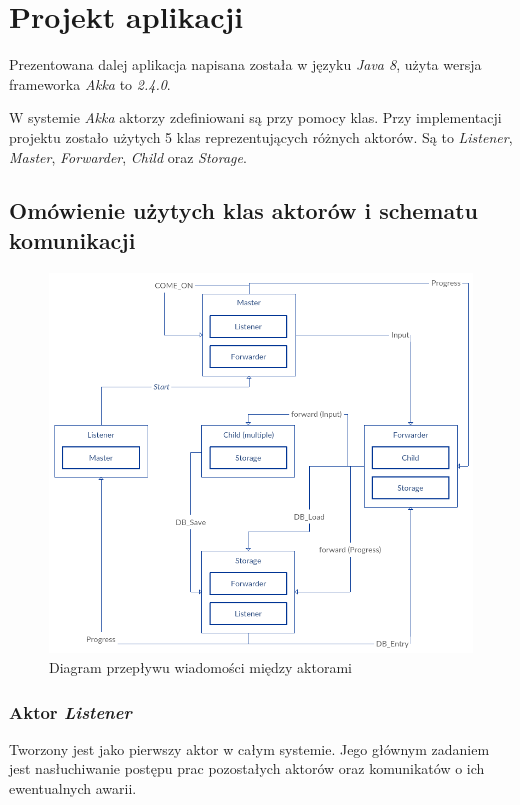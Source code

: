 \documentclass[12pt,titlepage]{article}
\numberwithin{equation}{section}
\begin{document}
\section{Projekt aplikacji}
Prezentowana dalej aplikacja napisana została w języku \textit{Java 8}, użyta wersja frameworka \textit{Akka} to \textit{2.4.0}.

W systemie \textit{Akka} aktorzy zdefiniowani są przy pomocy klas. Przy implementacji projektu zostało użytych 5 klas reprezentujących różnych aktorów. Są to \textit{Listener}, \textit{Master}, \textit{Forwarder}, \textit{Child} oraz \textit{Storage}.

\subsection{Omówienie użytych klas aktorów i schematu komunikacji}

\begin{figure}[H]
\begin{center}
\includegraphics[scale=0.5]{akka.png}
\end{center}
\caption{Diagram przepływu wiadomości między aktorami} %
\end{figure} 

\subsubsection{Aktor \textit{Listener}}
Tworzony jest jako pierwszy aktor w całym systemie. Jego głównym zadaniem jest nasłuchiwanie postępu prac pozostałych aktorów oraz komunikatów o ich ewentualnych awarii.
\end{document}

